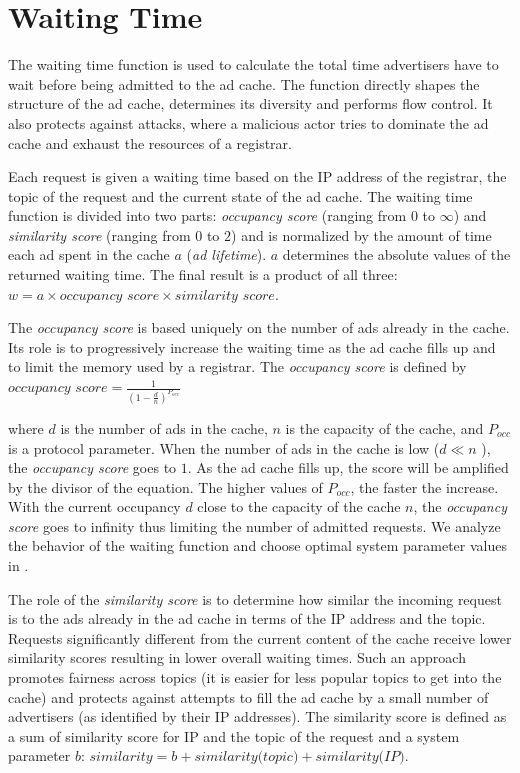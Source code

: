 \section{Waiting Time}
\label{sec:waitingTime}

The waiting time function is used to calculate the total time advertisers have to wait before being admitted to the ad cache. 
The function directly shapes the structure of the ad cache, determines its diversity and performs flow control. 
It also protects against attacks, where a malicious actor tries to dominate the ad cache and exhaust the resources of a registrar. 

Each request is given a waiting time based on the IP address of the registrar, the topic of the request and the current state of the ad cache. 
The waiting time function is divided into two parts: \emph{occupancy score} (ranging from $0$ to $\infty$) and  \emph{similarity score} (ranging from $0$ to $2$) and is normalized by the amount of time each ad spent in the cache $a$ (\ie \emph{ad lifetime}). $a$ determines the absolute values of the returned waiting time. The final result is a product of all three: $w = a \times \textit{occupancy score} \times \textit{similarity score}.$

The \emph{occupancy score} is based uniquely on the number of ads already in the cache.
Its role is to progressively increase the waiting time as the ad cache fills up and to limit the memory used by a registrar.
The \emph{occupancy score} is defined by $\textit{occupancy score} = \frac{1}{(1-\frac{d}{n})^{P_{occ}}}$

where $d$ is the number of ads in the cache, $n$ is the capacity of the cache, and $P_\textit{occ}$ is a protocol parameter. 
When the number of ads in the cache is low ($d \ll n$ ), the \emph{occupancy score} goes to $1$. 
As the ad cache fills up, the score will be amplified by the divisor of the equation. 
The higher values of $P_\textit{occ}$, the faster the increase. 
With the current occupancy $d$ close to the capacity of the cache $n$, the \emph{occupancy score} goes to infinity thus limiting the number of admitted requests. We analyze the behavior of the waiting function and choose optimal system parameter values in .

The role of the \emph{similarity score} is to determine how similar the incoming request is to the ads already in the ad cache in terms of the IP address and the topic. 
Requests significantly different from the current content of the cache receive lower similarity scores resulting in lower overall waiting times. 
Such an approach promotes fairness across topics (it is easier for less popular topics to get into the cache) and protects against attempts to fill the ad cache by a small number of advertisers (as identified by their IP addresses). The similarity score is defined as a sum of similarity score for IP and the topic of the request and a system parameter $b$: $\textit{similarity} = b + \textit{similarity(topic)} + \textit{similarity(IP)}$. 

